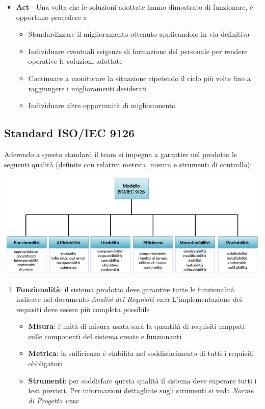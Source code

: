 {\begin{itemize}
  \item  \textbf{Act} - Una volta che le soluzioni adottate hanno dimostrato di funzionare, è opportuno procedere a
  \begin{itemize}
    \item Standardizzare il miglioramento ottenuto applicandolo in via definitiva
    \item Individuare eventuali esigenze di formazione del personale per rendere operative le soluzioni adottate
    \item Continuare a monitorare la situazione ripetendo il ciclo più volte fino a raggiungere i miglioramenti desiderati
    \item Individuare altre opportunità di miglioramento
  \end{itemize}
\end{itemize}

\subsection{Standard ISO/IEC 9126}

Aderendo a questo standard il team si impegna a garantire nel prodotto
le seguenti qualità (definite con relativa metrica, misura e
strumenti di controllo): \\




  \begin{center}
   \includegraphics[scale=0.5]{img/Iso9126.png}
\end{center}




\begin{enumerate}
  \item \textbf{Funzionalità}: il sistema prodotto deve garantire tutte
  le funzionalità indicate nel documento \emph{Analisi dei Requisiti
  vxxx} L'implementazione dei requisiti deve essere più completa
  possibile
  
  \begin{itemize}
    \item \textbf{Misura}: l’unità di misura usata sarà la quantità di requisiti mappati sulle componenti del sistema create e funzionanti
    \item \textbf{Metrica}: la sufficienza è stabilita nel soddisfacimento di tutti i requisiti obbligatori
    \item \textbf{Strumenti}: per soddisfare questa qualità il sistema deve superare tutti i test previsti.
    Per informazioni dettagliate sugli strumenti si veda  \emph{Norme di Progetto vxxx} 
  \end{itemize}
  

\end{enumerate}}
